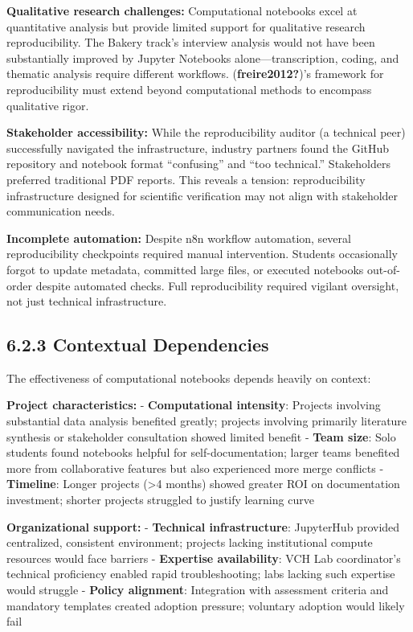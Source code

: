 \documentclass[
  oneside,
  open=any]{scrbook}
\begin{document}
\textbf{Qualitative research challenges:} Computational notebooks excel
at quantitative analysis but provide limited support for qualitative
research reproducibility. The Bakery track's interview analysis would
not have been substantially improved by Jupyter Notebooks
alone---transcription, coding, and thematic analysis require different
workflows. (\textbf{freire2012?})'s framework for reproducibility must
extend beyond computational methods to encompass qualitative rigor.

\textbf{Stakeholder accessibility:} While the reproducibility auditor (a
technical peer) successfully navigated the infrastructure, industry
partners found the GitHub repository and notebook format ``confusing''
and ``too technical.'' Stakeholders preferred traditional PDF reports.
This reveals a tension: reproducibility infrastructure designed for
scientific verification may not align with stakeholder communication
needs.

\textbf{Incomplete automation:} Despite n8n workflow automation, several
reproducibility checkpoints required manual intervention. Students
occasionally forgot to update metadata, committed large files, or
executed notebooks out-of-order despite automated checks. Full
reproducibility required vigilant oversight, not just technical
infrastructure.

\subsection{6.2.3 Contextual
Dependencies}\label{contextual-dependencies}

The effectiveness of computational notebooks depends heavily on context:

\textbf{Project characteristics:} - \textbf{Computational intensity}:
Projects involving substantial data analysis benefited greatly; projects
involving primarily literature synthesis or stakeholder consultation
showed limited benefit - \textbf{Team size}: Solo students found
notebooks helpful for self-documentation; larger teams benefited more
from collaborative features but also experienced more merge conflicts -
\textbf{Timeline}: Longer projects (\textgreater4 months) showed greater
ROI on documentation investment; shorter projects struggled to justify
learning curve

\textbf{Organizational support:} - \textbf{Technical infrastructure}:
JupyterHub provided centralized, consistent environment; projects
lacking institutional compute resources would face barriers -
\textbf{Expertise availability}: VCH Lab coordinator's technical
proficiency enabled rapid troubleshooting; labs lacking such expertise
would struggle - \textbf{Policy alignment}: Integration with assessment
criteria and mandatory templates created adoption pressure; voluntary
adoption would likely fail
\end{document}

